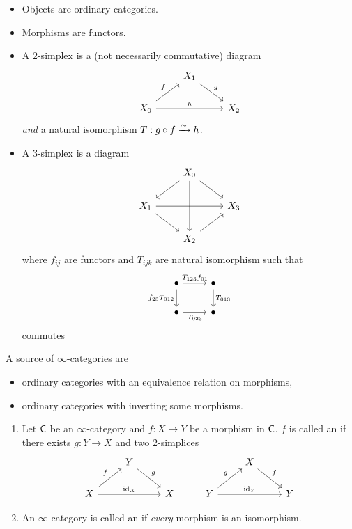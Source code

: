 \begin{example}
\begin{enumerate}[1)]
		\begin{itemize}
			\item Objects are ordinary categories.
			\item Morphisms are functors.
			\item A 2-simplex is a (not necessarily commutative) diagram
				\[
					\begin{tikzcd}
						& X_1 \ar[dr,"g"] \\
						X_0 \ar[ur,"f"] \ar[rr,"h"] & & X_2
					\end{tikzcd}
				\]
				\emph{and} a natural isomorphism $T:g\circ f \xrightarrow{\sim} h$.
			\item A 3-simplex is a diagram
				\[
					\begin{tikzcd}
						& X_0 \ar[dl] \ar[dr] \ar[dd] \\
						X_1 \ar[rr] \ar[dr] & & X_3 \\
						& X_2 \ar[ur]
					\end{tikzcd}
				\]
				where $f_{ij}$ are functors and $T_{ijk}$ are natural isomorphism such that
				\[
					\begin{tikzcd}
						\bullet \ar[r,"T_{123}f_{01}"] \ar[d,"f_{23}T_{012}"'] & \bullet \ar[d,"T_{013}"] \\
						\bullet \ar[r,"T_{023}"'] & \bullet
					\end{tikzcd}
				\]
				commutes
		\end{itemize}
\end{enumerate}
\end{example}
A source of $\infty$-categories are
\begin{itemize}
\item ordinary categories with an equivalence relation on morphisms,
\item ordinary categories with inverting some morphisms.
\end{itemize}
\begin{definition} \leavevmode
\begin{enumerate}[1.]
	\item Let $\mathsf{C}$ be an $\infty$-category and $f:X\to Y$ be a morphism in $\mathsf{C}$. $f$ is
		called an  if there exists $g:Y\to X$ and two 2-simplices
		\[
			\begin{tikzcd}
			 & Y \ar[dr,"g"] & & & X \ar[dr,"f"] \\
				X \ar[ur,"f"] \ar[rr,"\id_X"] & & X & Y \ar[ur,"g"] \ar[rr,"\id_Y"] & & Y
			\end{tikzcd}
		\]
	\item An $\infty$-category is called an  if \emph{every}
		morphism is an isomorphism.
\end{enumerate}
\end{definition}
